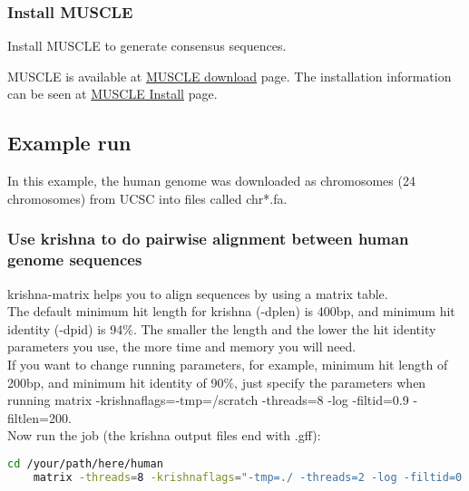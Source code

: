 \documentclass[a4paper,12pt]{article}
\begin{document}
	\subsubsection{ Install MUSCLE}
	Install MUSCLE to generate consensus sequences.
	
	\noindent MUSCLE is available at \href{https://www.drive5.com/muscle/downloads.htm} {\color{blue}MUSCLE download} page.
	\noindent The installation information can be seen at \href{https://www.drive5.com/muscle/manual/install.html} {\color{blue}MUSCLE Install} page.
	
	
	\subsection{Example run}
	In this example, the human genome was downloaded as chromosomes (24 chromosomes) from UCSC into files called chr*.fa.
	
	\subsubsection{Use krishna to do pairwise alignment between human genome sequences}
	
	krishna-matrix helps you to align sequences by using a matrix table. \\
	
	\noindent The default minimum hit length for krishna (-dplen) is 400bp, and minimum hit identity (-dpid) is 94\%. The smaller the length and the lower the hit identity parameters you use, the more time and memory you will need. \\
	
	\noindent If you want to change running parameters, for example, minimum hit length of 200bp, and minimum hit identity of 90\%, just specify the parameters when running matrix {\color{red}-krishnaflags=\textquotedbl-tmp=/scratch -threads=8 -log -filtid=0.9 -filtlen=200\textquotedbl}.\\
	
	\noindent Now run the job (the krishna output files end with .gff):
	
	\begin{lstlisting}[language=bash]
	cd /your/path/here/human 
	matrix -threads=8 -krishnaflags="-tmp=./ -threads=2 -log -filtid=0.94 -filtlen=400" chr*.fa \end{lstlisting}
	
\end{document}
